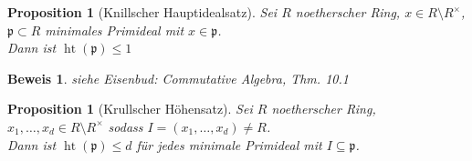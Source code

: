 \documentclass[a4paper,12pt]{report}
\theoremstyle{break}
\newtheorem{Prop}[Def]{Proposition}
\theoremstyle{nonumberbreak}
\newtheorem{Bew}{Beweis}
\theoremstyle{nonumberplain}
\DeclareMathOperator{\Ht}{ht}
\newcommand{\frakp}{\mathfrak{p}}
\begin{document}
\begin{Prop}[Knillscher Hauptidealsatz]\label{prop18.11}
Sei $R$ noetherscher Ring, $x\in R\setminus R^{\times}$, $\mathfrak p\subset R$ minimales Primideal mit $x\in \mathfrak p$.\\
Dann ist $\Ht(\frakp)\le1$
\end{Prop}

\begin{Bew}
siehe Eisenbud: Commutative Algebra, Thm. 10.1
\end{Bew}

\begin{Prop}[Krullscher H\"ohensatz]
Sei $R$ noetherscher Ring, $x_1,\ldots ,x_d\in R\setminus R^{\times}$ sodass $I=(x_1,\ldots ,x_d)\ne R$.\\
Dann ist $\Ht(\frakp)\le d$ f\"ur jedes minimale Primideal mit $I\subseteq \frakp$.
\end{Prop}
\end{document}

